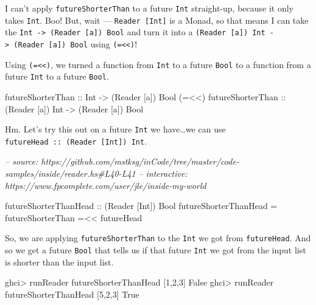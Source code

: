 \documentclass[]{article}
\newenvironment{Shaded}{}{}
\newcommand{\CommentTok}[1]{\textcolor[rgb]{0.38,0.63,0.69}{\textit{#1}}}
\newcommand{\DataTypeTok}[1]{\textcolor[rgb]{0.56,0.13,0.00}{#1}}
\newcommand{\DecValTok}[1]{\textcolor[rgb]{0.25,0.63,0.44}{#1}}
\newcommand{\FunctionTok}[1]{\textcolor[rgb]{0.02,0.16,0.49}{#1}}
\newcommand{\NormalTok}[1]{#1}
\newcommand{\OtherTok}[1]{\textcolor[rgb]{0.00,0.44,0.13}{#1}}
\begin{document}
I can't apply \texttt{futureShorterThan} to a future \texttt{Int} straight-up,
because it only takes \texttt{Int}. Boo! But, wait ---
\texttt{Reader\ {[}Int{]}} is a Monad, so that means I can take the
\texttt{Int\ -\textgreater{}\ (Reader\ {[}a{]})\ Bool} and turn it into a
\texttt{(Reader\ {[}a{]})\ Int\ -\textgreater{}\ (Reader\ {[}a{]})\ Bool} using
\texttt{(=\textless{}\textless{})}!

Using \texttt{(=\textless{}\textless{})}, we turned a function from \texttt{Int}
to a future \texttt{Bool} to a function from a future \texttt{Int} to a future
\texttt{Bool}.

\begin{Shaded}
\begin{Highlighting}[]
\OtherTok{futureShorterThan       ::} \DataTypeTok{Int}              \OtherTok{->}\NormalTok{ (}\DataTypeTok{Reader}\NormalTok{ [a]) }\DataTypeTok{Bool}
\NormalTok{(}\FunctionTok{=<<}\NormalTok{)}\OtherTok{ futureShorterThan ::}\NormalTok{ (}\DataTypeTok{Reader}\NormalTok{ [a]) }\DataTypeTok{Int} \OtherTok{->}\NormalTok{ (}\DataTypeTok{Reader}\NormalTok{ [a]) }\DataTypeTok{Bool}
\end{Highlighting}
\end{Shaded}

Hm. Let's try this out on a future \texttt{Int} we have\ldots{}we can use
\texttt{futureHead\ ::\ (Reader\ {[}Int{]})\ Int}.

\begin{Shaded}
\begin{Highlighting}[]
\CommentTok{-- source: https://github.com/mstksg/inCode/tree/master/code-samples/inside/reader.hs#L40-L41}
\CommentTok{-- interactive: https://www.fpcomplete.com/user/jle/inside-my-world}

\OtherTok{futureShorterThanHead ::}\NormalTok{ (}\DataTypeTok{Reader}\NormalTok{ [}\DataTypeTok{Int}\NormalTok{]) }\DataTypeTok{Bool}
\NormalTok{futureShorterThanHead }\FunctionTok{=}\NormalTok{ futureShorterThan }\FunctionTok{=<<}\NormalTok{ futureHead}
\end{Highlighting}
\end{Shaded}

So, we are applying \texttt{futureShorterThan} to the \texttt{Int} we got from
\texttt{futureHead}. And so we get a future \texttt{Bool} that tells us if that
future \texttt{Int} we got from the input list is shorter than the input list.

\begin{Shaded}
\begin{Highlighting}[]
\NormalTok{ghci}\FunctionTok{>}\NormalTok{ runReader futureShorterThanHead [}\DecValTok{1}\NormalTok{,}\DecValTok{2}\NormalTok{,}\DecValTok{3}\NormalTok{]}
\DataTypeTok{False}
\NormalTok{ghci}\FunctionTok{>}\NormalTok{ runReader futureShorterThanHead [}\DecValTok{5}\NormalTok{,}\DecValTok{2}\NormalTok{,}\DecValTok{3}\NormalTok{]}
\DataTypeTok{True}
\end{Highlighting}
\end{Shaded}
\end{document}
